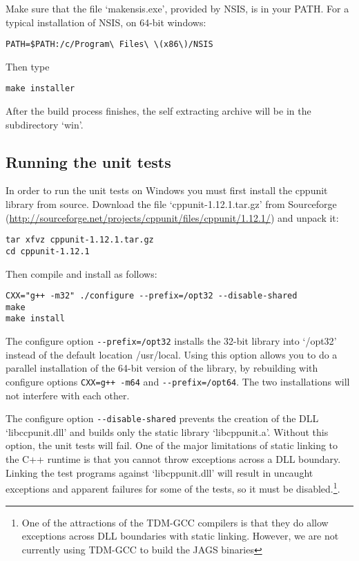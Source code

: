 \documentclass[11pt, a4paper, titlepage]{article}
\newcommand{\file}[1]{{`\normalfont\textsf{#1}'}}
\begin{document}
Make sure that the file \file{makensis.exe}, provided by
NSIS, is in your PATH. For a typical installation of NSIS, on 64-bit
windows:
\begin{verbatim}
PATH=$PATH:/c/Program\ Files\ \(x86\)/NSIS
\end{verbatim}
Then type
\begin{verbatim}
make installer
\end{verbatim}
After the build process finishes, the self extracting archive will be
in the subdirectory \file{win}.

\subsection{Running the unit tests}

In order to run the unit tests on Windows you must first install the
cppunit library from source. Download the file \file{cppunit-1.12.1.tar.gz}
from Sourceforge (\url{http://sourceforge.net/projects/cppunit/files/cppunit/1.12.1/}) and
unpack it:
\begin{verbatim}
tar xfvz cppunit-1.12.1.tar.gz
cd cppunit-1.12.1
\end{verbatim}
Then compile and install as follows:
\begin{verbatim}
CXX="g++ -m32" ./configure --prefix=/opt32 --disable-shared
make
make install
\end{verbatim}
The configure option \verb+--prefix=/opt32+ installs the 32-bit
library into \file{/opt32} instead of the default location
{/usr/local}. Using this option allows you to do a parallel
installation of the 64-bit version of the library, by rebuilding with
configure options \verb|CXX=g++ -m64| and \verb+--prefix=/opt64+. The two
installations will not interfere with each other.

The configure option \verb+--disable-shared+ prevents the creation of
the DLL \file{libccpunit.dll} and builds only the static library
\file{libcppunit.a}. Without this option, the unit tests will fail.
One of the major limitations of static linking to the C++ runtime is
that you cannot throw exceptions across a DLL boundary.  Linking the
test programs against \file{libcppunit.dll} will result in uncaught
exceptions and apparent failures for some of the tests, so it must be
disabled.\footnote{One of the attractions of the TDM-GCC compilers is
  that they do allow exceptions across DLL boundaries with static
  linking. However, we are not currently using TDM-GCC to build the
  JAGS binaries}.
\end{document}
